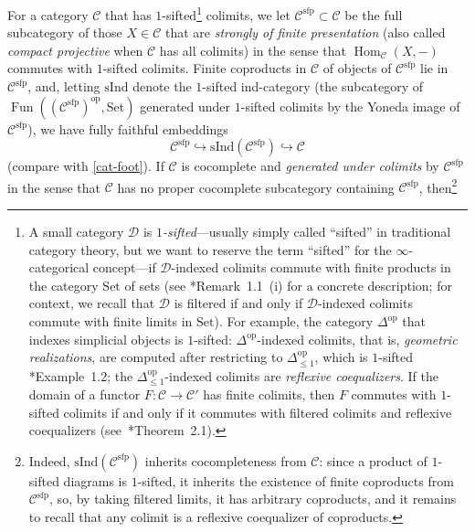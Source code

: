 \documentclass[11pt, reqno]{amsart}
\newcommand{\sC}{\mathscr{C}}
\newcommand{\sD}{\mathscr{D}}
\DeclareMathOperator{\Fun}{Fun}		%
\DeclareMathOperator{\Hom}{Hom}		%
\newcommand{\hra}{\hookrightarrow}
\newcommand{\op}{{\mathrm{op}}}			%
\newcommand{\ra}{\rightarrow}
\providecommand{\Set}{\mathrm{Set}}
\newcommand{\sfp}{\mathrm{sfp}}		%
\providecommand{\qx}[1]{\quad\text{#1}}
\numberwithin{equation}{numberingbase}
\theoremstyle{thms}
\theoremstyle{claims}
\theoremstyle{defs}
\theoremstyle{thms}
\theoremstyle{defs}
\theoremstyle{subsection-tweak}
\theoremstyle{subsection-tweak}
\begin{document}
For a category $\sC$ that has $1$-sifted\footnote{\label{foot-sifted}A small category $\sD$ is \emph{$1$-sifted}---usually simply called ``sifted'' in traditional category theory, but we want to reserve the term ``sifted'' for the $\infty$-categorical concept---if $\sD$-indexed colimits commute with finite products in the category $\Set$ of sets (see \cite{ARV10}*{Remark~1.1~(i)} for a concrete description; for context, we recall that $\sD$ is filtered if and only if $\sD$-indexed colimits commute with finite limits in $\Set$). %
For example, the category $\Delta^\op$ that indexes simplicial objects is $1$-sifted: $\Delta^\op$-indexed colimits, that is, \emph{geometric realizations}, are computed after restricting to $\Delta^\op_{\le 1}$, %
which is $1$-sifted \cite{ARV10}*{Example~1.2}; the $\Delta^\op_{\le 1}$-indexed colimits are \emph{reflexive coequalizers}. If the domain of a functor $F \colon \sC \ra \sC'$  has finite colimits, then $F$ commutes with $1$-sifted colimits if and only if it commutes with filtered colimits and reflexive coequalizers (see~\cite{ARV10}*{Theorem~2.1}).
} colimits, %
we let $\sC^{\mathrm{sfp}} \subset \sC$ be the full subcategory of those $X \in \sC$ that are \emph{strongly of finite presentation} (also called \emph{compact projective} when $\sC$ has all colimits) in the sense that $\Hom_{\sC}(X, -)$ commutes with $1$-sifted colimits. Finite coproducts in $\sC$ of objects of $\sC^\sfp$ lie in $\sC^\sfp$, and, letting $\mathrm{sInd}$ denote the $1$-sifted ind-category (the subcategory of $\Fun((\sC^\sfp)^\op,\Set)$ generated under $1$-sifted colimits by the Yoneda image of $\sC^\sfp$), we have fully faithful embeddings %
\[
\sC^\sfp \hra \mathrm{sInd}(\sC^\sfp) \hra \sC %
\]
(compare with \cref{cat-foot}). 
If $\sC$ is cocomplete and \emph{generated under colimits} by $\sC^\sfp$ in the sense that $\sC$ has no proper cocomplete subcategory containing $\sC^\sfp$, then\footnote{\label{sInd-coco}Indeed, $\mathrm{sInd}(\sC^\sfp)$ inherits cocompleteness from $\sC$: since a product of $1$-sifted diagrams is $1$-sifted, %
it inherits the existence of finite coproducts from $\sC^\sfp$, so, by taking filtered limits, it has arbitrary coproducts, and it remains to recall that any colimit is a reflexive coequalizer of coproducts.} 
\end{document}
